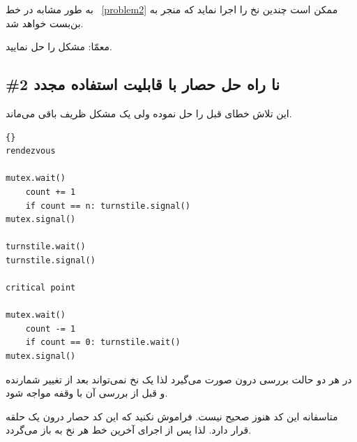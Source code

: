 \documentclass{book}
\newcommand{\clearemptydoublepage}{\newpage\cleardoublepage}
\begin{document}
    به طور مشابه در خط ~\ref{problem2} ممکن است چندین نخ   را اجرا نماید که منجر به بن‌بست خواهد شد. 

    معمّا: مشکل را حل نمایید. 

\clearemptydoublepage
\subsection { \#2 نا راه حل حصار با قابلیت استفاده مجدد}

    این تلاش خطای قبل را حل نموده ولی یک مشکل ظریف باقی می‌ماند. 

\begin{latin}
\begin{latin}
\begin{lstlisting}[title=\rl{{  نا راه حل حصار با قابلیت استفاده مجدد}}]{} 
rendezvous

mutex.wait()
    count += 1
    if count == n: turnstile.signal()
mutex.signal()

turnstile.wait()
turnstile.signal()

critical point

mutex.wait()
    count -= 1
    if count == 0: turnstile.wait()
mutex.signal()
\end{lstlisting}
\end{latin}
\end{latin}

    در هر دو حالت بررسی درون  صورت می‌گیرد لذا یک نخ نمی‌تواند بعد از تغییر شمارنده و قبل از بررسی آن با وقفه مواجه شود. 

    متاسفانه این کد هنوز صحیح نیست. فراموش نکنید که این کد حصار درون یک حلقه قرار دارد. لذا پس از اجرای آخرین خط 
    هر نخ به  باز می‌گردد. 
\end{document}
